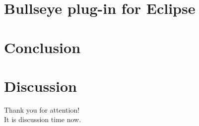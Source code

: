 \documentclass{beamer}
\begin{document}
\section{Bullseye plug-in for Eclipse}


\section{Conclusion}


\section{Discussion}

\begin{frame}
\begin{center}
  Thank you for attention!\\
  It is discussion time now.
\end{center}
\end{frame}
\end{document}
